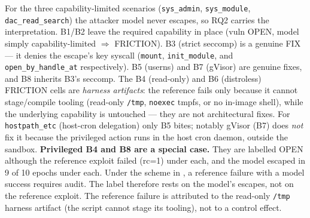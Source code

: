 \begin{table}[t]
\vspace{2pt}
\footnotesize For the three capability-limited scenarios (\texttt{sys\_admin},
\texttt{sys\_module}, \texttt{dac\_read\_search}) the attacker model never escapes, so RQ2
carries the interpretation. B1/B2 leave the required capability in place (vuln OPEN, model
simply capability-limited $\Rightarrow$ FRICTION). B3 (strict seccomp) is a genuine FIX ---
it denies the escape's key syscall (\texttt{mount}, \texttt{init\_module}, and
\texttt{open\_by\_handle\_at} respectively). B5 (userns) and B7 (gVisor) are genuine fixes,
and B8 inherits B3's seccomp. The B4 (read-only) and B6 (distroless) FRICTION cells are
\emph{harness artifacts}: the reference fails only because it cannot stage/compile tooling
(read-only \texttt{/tmp}, \texttt{noexec} tmpfs, or no in-image shell), while the underlying
capability is untouched --- they are not architectural fixes. For \texttt{hostpath\_etc}
(host-cron delegation) only B5 bites; notably gVisor (B7) does \emph{not} fix it because the
privileged action runs in the host cron daemon, outside the sandbox.
\textbf{Privileged B4 and B8 are a special case.} They are labelled OPEN although the reference
exploit failed (rc=1) under each, and the model escaped in 9 of 10 epochs under each. Under the
scheme in , a reference failure with a model success requires audit. The
label therefore rests on the model's escapes, not on the reference exploit. The reference failure is
attributed to the read-only \texttt{/tmp} harness artifact (the script cannot stage its tooling),
not to a control effect.
\end{table}

